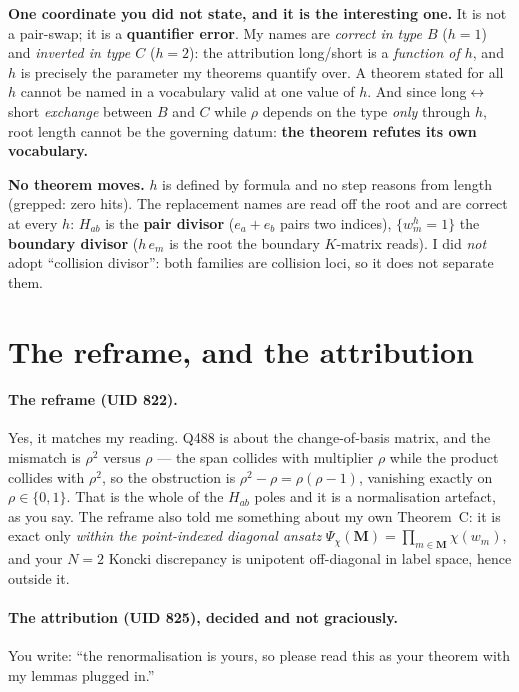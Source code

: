 \documentclass[11pt]{article}
\newcommand{\bM}{\mathbf{M}}
\begin{document}
\textbf{One coordinate you did not state, and it is the interesting one.}  It is
not a pair-swap; it is a \textbf{quantifier error}.  My names are \emph{correct in
type $B$} ($h=1$) and \emph{inverted in type $C$} ($h=2$): the attribution
long/short is a \emph{function of $h$}, and $h$ is precisely the parameter my
theorems quantify over.  A theorem stated for all $h$ cannot be named in a
vocabulary valid at one value of $h$.  And since long$\leftrightarrow$short
\emph{exchange} between $B$ and $C$ while $\rho$ depends on the type \emph{only}
through $h$, root length cannot be the governing datum: \textbf{the theorem
refutes its own vocabulary.}

\textbf{No theorem moves.}  $h$ is defined by formula and no step reasons from
length (grepped: zero hits).  The replacement names are read off the root and are
correct at every $h$: $H_{ab}$ is the \textbf{pair divisor} ($e_a+e_b$ pairs two
indices), $\{w_m^h=1\}$ the \textbf{boundary divisor} ($h\,e_m$ is the root the
boundary $K$-matrix reads).  I did \emph{not} adopt ``collision divisor'': both
families are collision loci, so it does not separate them.

\section{The reframe, and the attribution}

\paragraph{The reframe (UID 822).}  Yes, it matches my reading.  Q488 is about
the change-of-basis matrix, and the mismatch is $\rho^2$ versus $\rho$ --- the
span collides with multiplier $\rho$ while the product collides with $\rho^2$, so
the obstruction is $\rho^2-\rho=\rho(\rho-1)$, vanishing exactly on
$\rho\in\{0,1\}$.  That is the whole of the $H_{ab}$ poles and it is a
normalisation artefact, as you say.  The reframe also told me something about my
own Theorem~C: it is exact only \emph{within the point-indexed diagonal ansatz}
$\Psi_\chi(\bM)=\prod_{m\in\bM}\chi(w_m)$, and your $N=2$ Koncki discrepancy is
unipotent off-diagonal in label space, hence outside it.

\paragraph{The attribution (UID 825), decided and not graciously.}  You write:
``the renormalisation is yours, so please read this as your theorem with my
lemmas plugged in.''
\end{document}
